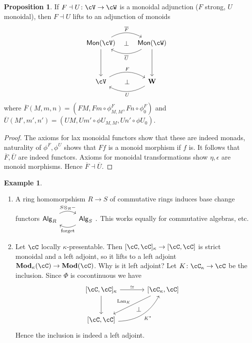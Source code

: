 \documentclass[a4paper,11pt,oneside,openany]{scrbook}
\newcommand{\catname}[1]{{\normalfont\textbf{#1}}}
\newcommand{\Mod}{\catname{Mod}}
\newcommand{\from}{\colon}
\DeclareMathOperator{\Mon}{\mathsf{Mon}}
\DeclareMathOperator{\Lan}{Lan}
\theoremstyle{definition}
\theoremstyle{definition}
\newtheorem{prop}[thm]{Proposition}
\newtheorem{exmp}[thm]{Example}
\begin{document}
\begin{prop}
    If $ F \dashv U \from\cV\to \cW $ is a monoidal adjunction ($ F $ strong, $ U $ monoidal), then $ F\dashv U $ lifts to an adjunction of monoids
\begin{displaymath}
    \begin{tikzcd}[row sep = 4em]
        \Mon(\cV)\arrow[d] \arrow[r,bend left, "\overline F"]\arrow[r,phantom, "\bot"] & \Mon(\cW) \arrow[l, bend left, "\overline U"] \arrow[d]\\
       \cV\arrow[r,bend left, "F"] \arrow[r,phantom, "\bot"]& \catname W \arrow[l, bend left, "U"]
    \end{tikzcd}
    \end{displaymath}
    where $ \overline F(M,m,n) = (FM, Fm \circ \phi_{M,M}^F, Fn \circ \phi_0^F) $
    and $ \overline U(M',m',n') = (UM, Um'\circ \phi U_{M,M}, Un'\circ \phi U_0) $.
\end{prop}
\begin{proof}
    The axioms for lax monoidal functors show that these are indeed monads,
    naturality of $ \phi^F, \phi^U $ shows that $ Ff $ is a monoid morphism if $ f $ is.
    It follows that $ \overline F,\overline U $ are indeed functors.
    Axioms for monoidal transformations show $ \eta, \epsilon $ are monoid morphisms.
    Hence $ \overline F \dashv \overline U $.
\end{proof}
\begin{exmp}
    \begin{enumerate}[label=\roman*)]
        \item A ring homomorpshism $ R \to S $ of commutative rings induces base change functors$\begin{tikzcd}
        \mathsf{Alg}_R \arrow[r, "S\otimes_R -", bend left] & \mathsf{Alg}_S \arrow[l,"\text{forget}", bend left]
        \end{tikzcd}.$
        This works equally for commutative algebras, etc.
    \item Let $ \cC$ locally $ \kappa $-presentable. Then $ [\cC,\cC]_\kappa \to [\cC,\cC] $ is strict monoidal and a     left adjoint, so it lifts to a left adjoint $ \Mod_\kappa (\cC) \to \Mod(\cC) $.
        Why is it left adjoint? Let $ K\from \cC_\kappa \to \cC$ be the inclusion. Since $ \Phi $ is cocontinuous we have
        \begin{displaymath}
            \begin{tikzcd}[row sep = large, column sep = large]
            \lbrack\cC,\cC\rbrack_\kappa
            \arrow[r, "\simeq"]\arrow[d] &
            \lbrack\cC_\kappa,\cC\rbrack \arrow[dl, "\Lan_K"']\arrow[dl, phantom, "\bot", bend left=15] 
            \\
            \lbrack\cC, \cC\rbrack \arrow[ru, "K^*"', bend right]
            \end{tikzcd}
        \end{displaymath}
        Hence the inclusion is indeed a left adjoint.
    \end{enumerate}
\end{exmp}
\end{document}
